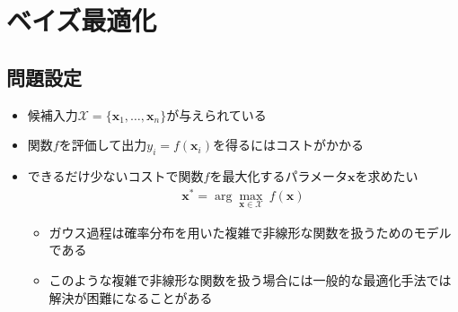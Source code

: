 \documentclass[dvipdfmx, 10.5pt]{beamer}
\begin{document}
\section{ベイズ最適化}




\subsection{問題設定}
\begin{frame}{\insertsubsection}
	\begin{itemize}
		\item 候補入力$\mathcal{X} = \{ \bm x_1, \ldots, \bm x_n \}$が与えられている

		\item 関数$f$を評価して出力$y_i = f(\bm x_i)$を得るにはコストがかかる

		\item できるだけ少ないコストで関数$f$を最大化するパラメータ$\bm x$を求めたい
		\begin{align*}
			\bm x^* = \arg \max_{\bm x \in \mathcal{X}} ~ f(\bm x)
		\end{align*}
		\begin{itemize}
			\item ガウス過程は確率分布を用いた複雑で非線形な関数を扱うためのモデルである
			\item このような複雑で非線形な関数を扱う場合には一般的な最適化手法では解決が困難になることがある
		\end{itemize}
	\end{itemize}
\end{frame}
\end{document}
